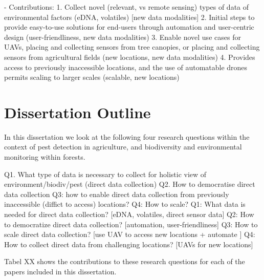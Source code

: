 - Contributions:
1. Collect novel (relevant, vs remote sensing) types of data of environmental factors (eDNA, volatiles) [new data modalities]
2. Initial steps to provide easy-to-use solutions for end-users through automation and user-centric design  (user-friendliness, new data modalities)
3. Enable novel use cases for UAVs, placing and collecting sensors from tree canopies, or placing and collecting sensors from agricultural fields (new locations, new data modalities)
4. Provides access to previously inaccessible locations, and the use of automatable drones permits scaling to larger scales (scalable, new locations)

\section{Dissertation Outline}
%
In this dissertation we look at the following four research questions within the context of pest detection in agriculture, and biodiversity and environmental monitoring within forests.

Q1. What type of data is necessary to collect for holistic view of environment/biodiv/pest (direct data collection)
Q2. How to democratise direct data collection
Q3: how to enable direct data collection from previously inaccessible (diffict to access) locations?
Q4: How to scale?
Q1: What data is needed for direct data collection? [eDNA, volatiles, direct sensor data]
Q2: How to democratize direct data collection? [automation, user-friendliness]
Q3: How to scale direct data collection? [use UAV to access new locations + automate ]
Q4: How to collect direct data from challenging locations? [UAVs for new locations]

Tabel XX shows the contributions to these research questions for each of the papers included in this dissertation. 

